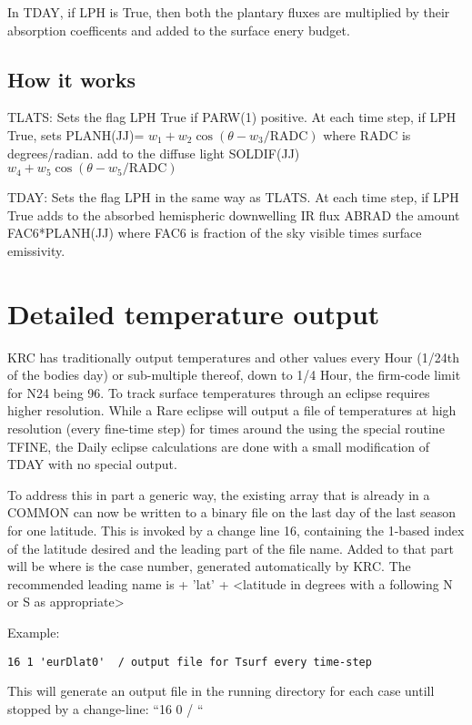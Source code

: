 \documentclass{article}
\begin{document}
In TDAY, if LPH is True, then both the plantary fluxes are multiplied by their
absorption coefficents and added to the surface enery budget.

\subsection{How it works}
TLATS: Sets the flag LPH True if PARW(1) positive. At each time step, if LPH
True, \qi sets PLANH(JJ)= $ w_1 +w_2 \cos( \theta - w_3/\mathrm{RADC})$ where
RADC is degrees/radian.  
\qi add to the diffuse light SOLDIF(JJ) $ w_4 +w_5\cos( \theta - w_5/\mathrm{RADC})$

TDAY:  Sets the flag LPH in the same way as TLATS.  At each time step, if LPH True
\qi adds to the absorbed hemispheric downwelling IR flux ABRAD the amount FAC6*PLANH(JJ) where FAC6 is fraction of the sky visible times surface emissivity.

\section{Detailed temperature output \label{tline}}
KRC has traditionally output temperatures and other values every Hour (1/24th of
the bodies day) or sub-multiple thereof, down to 1/4 Hour, the firm-code limit
for N24 being 96. To track surface temperatures through an eclipse requires
higher resolution. While a Rare eclipse will output a file of temperatures at
high resolution (every fine-time step) for times around the using the special
routine TFINE, the Daily eclipse calculations are done with a small modification
of TDAY with no special output.

To address this in part a generic way, the existing array  that is
already in a COMMON can now be written to a binary file on the last day of the
last season for one latitude.  This is invoked by a change line 16, containing 
 the 1-based index of the latitude desired and the leading part of the file
name. Added to that part will be  where  is the case number,
generated automatically by KRC.  The recommended leading name is
\qi + 'lat'
\qi + <latitude in degrees with a following N or S as appropriate>

Example: \vspace{-3.mm} 
\begin{verbatim}
16 1 'eurDlat0'  / output file for Tsurf every time-step
\end{verbatim} 

This will generate an output file in the running directory for each case untill
stopped by a change-line: ``16 0 / ``
\end{document}
